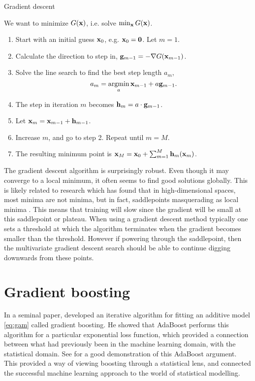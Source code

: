 \begin{algorithm}
\caption{Gradient descent}
\label{algo:grad-desc}
We want to minimize $G(\mathbf{x})$, i.e. solve $\min_{\mathbf{x}}G(\mathbf{x})$.
\begin{enumerate}
    \item Start with an initial guess $\mathbf{x}_0$, e.g. $\mathbf{x}_0=\mathbf{0}$. Let $m=1$.
    \item Calculate the direction to step in, $\mathbf{g}_{m-1}=-\nabla G(\mathbf{x}_{m-1})$.
    \item Solve the line search to find the best step length $a_m$,
        \begin{equation*}
            a_m=\operatorname*{argmin}_{a}\mathbf{x}_{m-1}+a \mathbf{g}_{m-1}.
        \end{equation*}
    \item The step in iteration $m$ becomes $\mathbf{h}_m=a\cdot\mathbf{g}_{m-1}$.
    \item Let $\mathbf{x}_m=\mathbf{x}_{m-1}+\mathbf{h}_{m-1}$.
    \item Increase $m$, and go to step 2. Repeat until $m=M$.
    \item The resulting minimum point is $\mathbf{x}_M=\mathbf{x}_0+\sum_{m=1}^M\mathbf{h}_m(\mathbf{x}_m)$.
\end{enumerate}
\end{algorithm}
The gradient descent algorithm is surprisingly robust. Even though it may converge to a local minimum, it often seems to find good solutions globally. This is likely related to research which has found that in high-dimensional spaces, most minima are not minima, but in fact, saddlepoints masquerading as local minima \citep{saddlepoints}. This means that training will slow since the gradient will be small at this saddlepoint or plateau. When using a gradient descent method typically one sets a threshold at which the algorithm terminates when the gradient becomes smaller than the threshold. However if powering through the saddlepoint, then the multivariate gradient descent search should be able to continue digging downwards from these points.

\section{Gradient boosting}
In a seminal paper, \citet{friedman2001} developed an iterative algorithm for fitting an additive model \eqref{eq:gam} called gradient boosting. He showed that AdaBoost performs this algorithm for a particular exponential loss function, which provided a connection between what had previously been in the machine learning domain, with the statistical domain. See \citet{ESL} for a good demonstration of this AdaBoost argument. This provided a way of viewing boosting through a statistical lens, and connected the successful machine learning approach to the world of statistical modelling.

